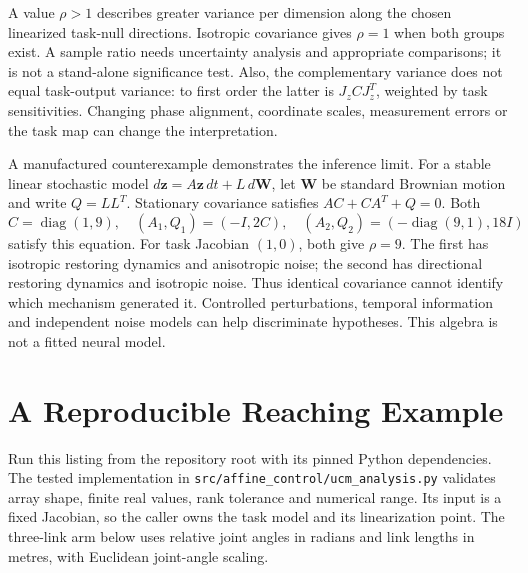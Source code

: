 A value $\rho>1$ describes greater variance per dimension along the chosen
linearized task-null directions. Isotropic covariance gives $\rho=1$ when
both groups exist. A sample ratio needs uncertainty analysis and appropriate
comparisons; it is not a stand-alone significance test.
Also, the complementary variance does not equal task-output variance:
to first order the latter is $J_zCJ_z^T$, weighted by task sensitivities.
Changing phase alignment, coordinate scales, measurement errors or the task
map can change the interpretation.

A manufactured counterexample demonstrates the inference limit.
For a stable linear stochastic model $d\bm z=A\bm z\,dt+L\,d\bm W$,
let $\bm W$ be standard Brownian motion and write $Q=LL^T$.
Stationary covariance satisfies $AC+CA^T+Q=0$.
Both
\[
 C=\operatorname{diag}(1,9),\quad
 (A_1,Q_1)=(-I,2C),\quad
 (A_2,Q_2)=(-\operatorname{diag}(9,1),18I)
\]
satisfy this equation.
For task Jacobian $(1,0)$, both give $\rho=9$.
The first has isotropic restoring dynamics and anisotropic noise; the second
has directional restoring dynamics and isotropic noise.
Thus identical covariance cannot identify which mechanism generated it.
Controlled perturbations, temporal information and independent noise models
can help discriminate hypotheses. This algebra is not a fitted neural model.

\section{A Reproducible Reaching Example}

Run this listing from the repository root with its pinned Python dependencies.
The tested implementation in \texttt{src/affine\_control/ucm\_analysis.py}
validates array shape, finite real values, rank tolerance and numerical range.
Its input is a fixed Jacobian, so the caller owns the task model and its
linearization point. The three-link arm below uses relative joint angles in
radians and link lengths in metres, with Euclidean joint-angle scaling.

